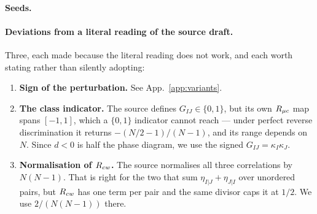 \paragraph{Seeds.} 

\paragraph{Deviations from a literal reading of the source draft.} Three, each
made because the literal reading does not work, and each worth stating rather than
silently adopting:
\begin{enumerate}
  \item \textbf{Sign of the perturbation.} See App.~\ref{app:variants}.
  \item \textbf{The class indicator.} The source defines $G_{IJ} \in \{0,1\}$, but
    its own $R_{\mu c}$ map spans $[-1,1]$, which a $\{0,1\}$ indicator cannot reach ---
    under perfect reverse discrimination it returns $-(N/2-1)/(N-1)$, and its range
    depends on $N$. Since $d < 0$ is half the phase diagram, we use the signed
    $G_{IJ} = \kappa_I \kappa_J$.
  \item \textbf{Normalisation of $R_{cw}$.} The source normalises all three
    correlations by $N(N-1)$. That is right for the two that sum
    $\eta_{I|J} + \eta_{J|I}$ over unordered pairs, but $R_{cw}$ has one term per
    pair and the same divisor caps it at $1/2$. We use $2/(N(N-1))$ there.
\end{enumerate}
